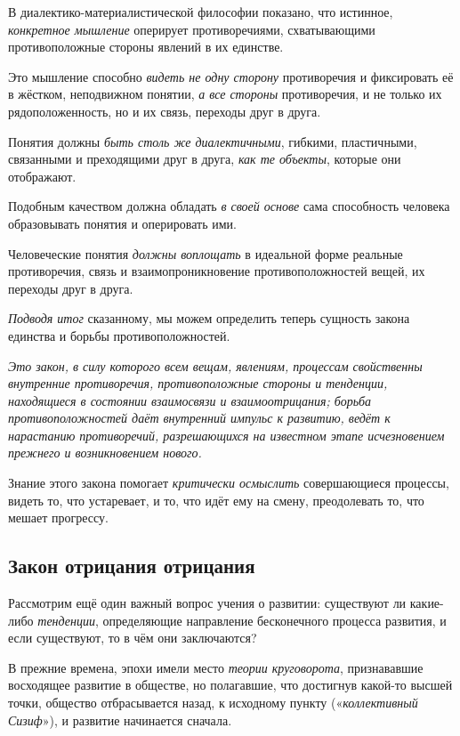 \documentclass[a4paper,14pt,russian]{extreport}
\begin{document}
В диалектико-материалистической философии показано, что истинное, \emph{конкретное мышление} оперирует противоречиями, схватывающими противоположные стороны явлений в их единстве.

Это мышление способно \emph{видеть не одну сторону} противоречия и фиксировать её в жёстком, неподвижном понятии, \emph{а все стороны} противоречия, и не только их рядоположенность, но и их связь, переходы друг в друга.

Понятия должны \emph{быть столь же диалектичными}, гибкими, пластичными, связанными и преходящими друг в друга, \emph{как те объекты}, которые они отображают.

Подобным качеством должна обладать \emph{в своей основе} сама способность человека образовывать понятия и оперировать ими.

Человеческие понятия \emph{должны воплощать} в идеальной форме реальные противоречия, связь и взаимопроникновение противоположностей вещей, их переходы друг в друга.

\emph{Подводя итог} сказанному, мы можем определить теперь сущность закона единства и борьбы противоположностей.

\emph{Это закон, в силу которого всем вещам, явлениям, процессам свойственны внутренние противоречия, противоположные стороны и тенденции, находящиеся в состоянии взаимосвязи и взаимоотрицания; борьба противоположностей даёт внутренний импульс к развитию, ведёт к нарастанию противоречий, разрешающихся на известном этапе исчезновением прежнего и возникновением нового.}

Знание этого закона помогает \emph{критически осмыслить} совершающиеся процессы, видеть то, что устаревает, и то, что идёт ему на смену, преодолевать то, что мешает прогрессу.

\subsection{Закон отрицания отрицания}

Рассмотрим ещё один важный вопрос учения о развитии: существуют ли какие-либо \emph{тенденции}, определяющие направление бесконечного процесса развития, и если существуют, то в чём они заключаются?

В прежние времена, эпохи имели место \emph{теории круговорота}, признававшие восходящее развитие в обществе, но полагавшие, что достигнув какой-то высшей точки, общество отбрасывается назад, к исходному пункту («\emph{коллективный Сизиф}»), и развитие начинается сначала.
\end{document}
